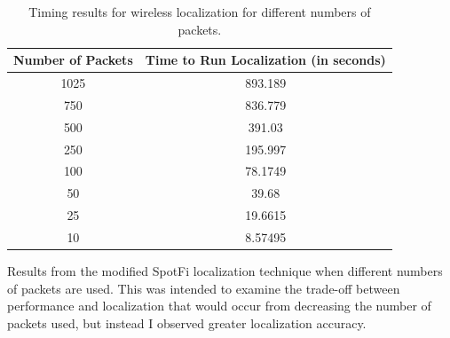 \documentclass[12pt]{report}
\begin{document}
\begin{table}[!htb]
    \begin{center}
        \caption{Timing results for wireless localization for different numbers of packets.}
        \label{table: sampling-timing-data}
        \begin{tabular}{| c | c |}
            \hline
            Number of Packets & Time to Run Localization (in seconds) \\
            \hline
            \hline
            1025 & 893.189 \\
            \hline
            750 & 836.779 \\
            \hline
            500 & 391.03 \\
            \hline
            250 & 195.997 \\
            \hline
            100 & 78.1749 \\
            \hline
            50 & 39.68 \\
            \hline
            25 & 19.6615 \\
            \hline
            10 & 8.57495 \\
            \hline
        \end{tabular}
    \end{center}
\end{table}

\begin{table}[p]
    \caption{Results from the modified SpotFi localization technique when different numbers of packets are used. This was intended to examine the trade-off between performance and localization that would occur from decreasing the number of packets used, but instead I observed greater localization accuracy.}
    \label{table: sampling-data-table}
    \begin{subfigure}[b]{0.3\textwidth}
        \begin{center}
            \scalebox{0.7}{}
        \end{center}
    \end{subfigure}
    \par\bigskip
    \begin{subfigure}[b]{0.3\textwidth}
        \begin{center}
            \scalebox{0.7}{}
        \end{center}
    \end{subfigure}
    \par\bigskip
    \begin{subfigure}[b]{0.3\textwidth}
        \begin{center}
            \scalebox{0.7}{}
        \end{center}
    \end{subfigure}
    \par\bigskip
\end{table}
\end{document}

